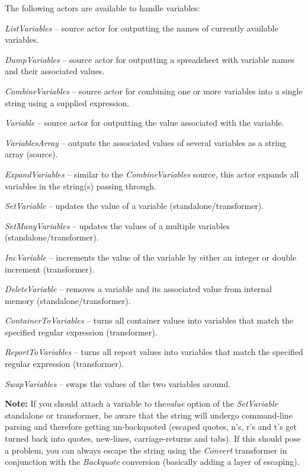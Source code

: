 The following actors are available to handle variables:
\begin{tight_itemize}
	\item \textit{ListVariables} -- source actor for outputting the names of 
	currently available variables.
	\item \textit{DumpVariables} -- source actor for outputting a spreadsheet with
	variable names and their associated values.
	\item \textit{CombineVariables} -- source actor for combining one or more
	variables into a single string using a supplied expression.
	\item \textit{Variable} -- source actor for outputting the value associated
	with the variable.
	\item \textit{VariablesArray} -- outputs the associated values of several
	variables as a string array (source).
	\item \textit{ExpandVariables} -- similar to the \textit{CombineVariables}
	source, this actor expands all variables in the string(s) passing through.
	\item \textit{SetVariable} -- updates the value of a variable (standalone/transformer).
	\item \textit{SetManyVariables} -- updates the values of a multiple variables (standalone/transformer).
	\item \textit{IncVariable} -- increments the value of the variable by either an
	integer or double increment (transformer).
	\item \textit{DeleteVariable} -- removes a variable and its associated value
	from internal memory (standalone/transformer).
	\item \textit{ContainerToVariables} -- turns all container values into variables
	that match the specified regular expression (transformer).
	\item \textit{ReportToVariables} -- turns all report values into variables
	that match the specified regular expression (transformer).
	\item \textit{SwapVariables} -- swaps the values of the two variables
	around.
\end{tight_itemize}

\noindent \textbf{Note:} If you should attach a variable to the\textit{value}
option of the \textit{SetVariable} standalone or transformer, be aware that
the string will undergo command-line parsing and therefore getting un-backquoted
(escaped quotes, n's, r's and t's get turned back into quotes, new-lines,
carriage-returns and tabs). If this should pose a problem, you can always
escape the string using the \textit{Convert} transformer in conjunction with
the \textit{Backquote} conversion (basically adding a layer of escaping).

